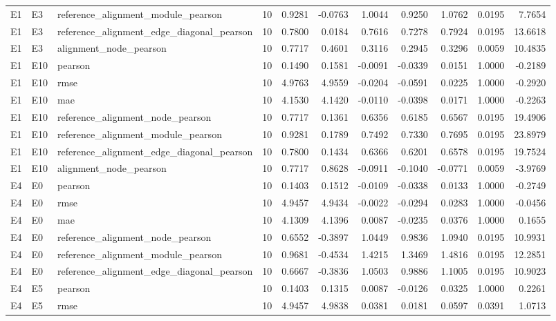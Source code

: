 \begin{tabular}{lllrrrrrrrr}
E1 & E3 & reference_alignment_module_pearson & 10 & 0.9281 & -0.0763 & 1.0044 & 0.9250 & 1.0762 & 0.0195 & 7.7654 \\
E1 & E3 & reference_alignment_edge_diagonal_pearson & 10 & 0.7800 & 0.0184 & 0.7616 & 0.7278 & 0.7924 & 0.0195 & 13.6618 \\
E1 & E3 & alignment_node_pearson & 10 & 0.7717 & 0.4601 & 0.3116 & 0.2945 & 0.3296 & 0.0059 & 10.4835 \\
E1 & E10 & pearson & 10 & 0.1490 & 0.1581 & -0.0091 & -0.0339 & 0.0151 & 1.0000 & -0.2189 \\
E1 & E10 & rmse & 10 & 4.9763 & 4.9559 & -0.0204 & -0.0591 & 0.0225 & 1.0000 & -0.2920 \\
E1 & E10 & mae & 10 & 4.1530 & 4.1420 & -0.0110 & -0.0398 & 0.0171 & 1.0000 & -0.2263 \\
E1 & E10 & reference_alignment_node_pearson & 10 & 0.7717 & 0.1361 & 0.6356 & 0.6185 & 0.6567 & 0.0195 & 19.4906 \\
E1 & E10 & reference_alignment_module_pearson & 10 & 0.9281 & 0.1789 & 0.7492 & 0.7330 & 0.7695 & 0.0195 & 23.8979 \\
E1 & E10 & reference_alignment_edge_diagonal_pearson & 10 & 0.7800 & 0.1434 & 0.6366 & 0.6201 & 0.6578 & 0.0195 & 19.7524 \\
E1 & E10 & alignment_node_pearson & 10 & 0.7717 & 0.8628 & -0.0911 & -0.1040 & -0.0771 & 0.0059 & -3.9769 \\
E4 & E0 & pearson & 10 & 0.1403 & 0.1512 & -0.0109 & -0.0338 & 0.0133 & 1.0000 & -0.2749 \\
E4 & E0 & rmse & 10 & 4.9457 & 4.9434 & -0.0022 & -0.0294 & 0.0283 & 1.0000 & -0.0456 \\
E4 & E0 & mae & 10 & 4.1309 & 4.1396 & 0.0087 & -0.0235 & 0.0376 & 1.0000 & 0.1655 \\
E4 & E0 & reference_alignment_node_pearson & 10 & 0.6552 & -0.3897 & 1.0449 & 0.9836 & 1.0940 & 0.0195 & 10.9931 \\
E4 & E0 & reference_alignment_module_pearson & 10 & 0.9681 & -0.4534 & 1.4215 & 1.3469 & 1.4816 & 0.0195 & 12.2851 \\
E4 & E0 & reference_alignment_edge_diagonal_pearson & 10 & 0.6667 & -0.3836 & 1.0503 & 0.9886 & 1.1005 & 0.0195 & 10.9023 \\
E4 & E5 & pearson & 10 & 0.1403 & 0.1315 & 0.0087 & -0.0126 & 0.0325 & 1.0000 & 0.2261 \\
E4 & E5 & rmse & 10 & 4.9457 & 4.9838 & 0.0381 & 0.0181 & 0.0597 & 0.0391 & 1.0713 \\

\end{tabular}
